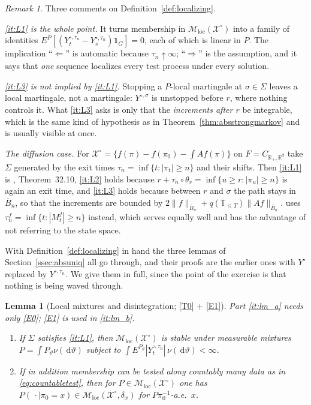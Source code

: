 \documentclass[11pt,a4paper]{article}
\theoremstyle{plain}
\newtheorem{lemma}[theorem]{Lemma}
\theoremstyle{definition}
\theoremstyle{remark}
\newtheorem{remark}[theorem]{Remark}
\newcommand{\R}{\mathbb{R}}
\newcommand{\Rp}{\R_+}
\newcommand{\T}{\mathbb{T}}                     %
\newcommand{\XX}{\mathcal{X}}                  %
\newcommand{\Msol}{\mathcal{M}}
\newcommand{\one}{\mathbf{1}}
\newcommand{\dif}{\,\mathrm{d}}
\newcommand{\KA}{\cite{Kal21}}
\begin{document}
\begin{remark}
  \label{rem:localhyp}
  Three comments on Definition~\ref{def:localizing}.

  \emph{\ref{it:L1} is the whole point.}  It turns membership in
  $\Msol_{\mathrm{loc}}(\XX^\circ)$ into a family of identities
  $E^P[(Y^{\circ,\tau_n}_t - Y^{\circ,\tau_n}_s)\one_G] = 0$, each of which is
  linear in $P$.  The implication ``$\Leftarrow$'' is automatic because
  $\tau_n \uparrow \infty$; ``$\Rightarrow$'' is the assumption, and it says that
  \emph{one} sequence localizes every test process under every solution.

  \emph{\ref{it:L3} is not implied by \ref{it:L1}.}  Stopping a $P$-local
  martingale at $\sigma \in \Sigma$ leaves a local martingale, not a martingale:
  $Y^{\circ,\sigma}$ is unstopped before $r$, where nothing controls it.  What
  \ref{it:L3} asks is only that the \emph{increments after $r$} be integrable,
  which is the same kind of hypothesis as in
  Theorem~\ref{thm:absstrongmarkov} and is usually visible at once.

  \emph{The diffusion case.}  For $\XX^\circ = \{f(\pi) - f(\pi_0) - \int A f(\pi)\}$
  on $F = C_{\Rp,\R^d}$ take $\Sigma$ generated by the exit times
  $\tau_n = \inf\{t : |\pi_t| \geq n\}$ and their shifts.  Then \ref{it:L1} is
  \KA, Theorem~32.10, \ref{it:L2} holds because
  $r + \tau_n \circ \theta_r = \inf\{u \geq r : |\pi_u| \geq n\}$ is again an exit
  time, and \ref{it:L3} holds because between $r$ and $\sigma$ the path stays in
  $\overline{B}_n$, so that the increments are bounded by
  $2\lVert f \rVert_{\overline{B}_n} + q(\T_{\leq T})\lVert Af \rVert_{\overline{B}_n}$.
  \KA{} uses $\tau^f_n = \inf\{t : |M^f_t| \geq n\}$ instead, which serves equally
  well and has the advantage of not referring to the state space.
\end{remark}

With Definition~\ref{def:localizing} in hand the three lemmas of
Section~\ref{ssec:absuniq} all go through, and their proofs are the earlier ones
with $Y^\circ$ replaced by $Y^{\circ,\tau_n}$.  We give them in full, since the
point of the exercise is that nothing is being waved through.

\begin{lemma}[Local mixtures and disintegration; \eqref{T0} + \eqref{E1}]
  \label{lem:localmix}
  Part \ref{it:lm_a} needs only \eqref{E0}; \eqref{E1} is used in
  \ref{it:lm_b}.
  \begin{enumerate}[label=(\alph*)]
  \item \label{it:lm_a}
    If $\Sigma$ satisfies \ref{it:L1}, then $\Msol_{\mathrm{loc}}(\XX^\circ)$ is
    stable under measurable mixtures $P = \int P_\vartheta \nu(\dif\vartheta)$
    subject to $\int E^{P_\vartheta}|Y^{\circ,\tau_n}_t| \, \nu(\dif\vartheta)
    < \infty$.
  \item \label{it:lm_b}
    If in addition membership can be tested along countably many data as in
    \eqref{eq:countabletest}, then for $P \in \Msol_{\mathrm{loc}}(\XX^\circ)$ one
    has $P(\,\cdot \mid \pi_0 = x) \in \Msol_{\mathrm{loc}}(\XX^\circ,\delta_x)$
    for $P\pi_0^{-1}$-a.e.\ $x$.
  \end{enumerate}
\end{lemma}
\end{document}
